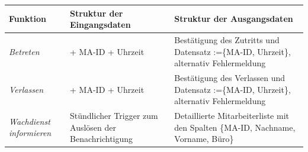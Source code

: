 {
\vspace{1cm}
\hspace{-2cm}
\footnotesize
\begin{tabular}{|p{3cm}|p{6cm}|p{6cm}|}
	\hline
		\textbf{Funktion	} &	
		\textbf{Struktur der Eingangsdaten} &
		\textbf{Struktur der Ausgangsdaten} \\
	\hline \hline
		\textit{Betreten} &
		+ MA-ID \newline + Uhrzeit &
		Best\"atigung des Zutritts und \newline Datensatz :=\{MA-ID, Uhrzeit\}, \newline alternativ Fehlermeldung \\
	\hline
		\textit{Verlassen} &
		+ MA-ID \newline + Uhrzeit &
		Best\"atigung des Verlassen und \newline Datensatz :=\{MA-ID, Uhrzeit\}, \newline alternativ Fehlermeldung \\
	\hline
		\textit{Wachdienst \newline informieren} &
		St\"undlicher Trigger zum Ausl\"osen der Benachrichtigung&
		Detaillierte Mitarbeiterliste mit den Spalten \{MA-ID, Nachname, Vorname, B\"uro\} \\
	\hline 
\end{tabular}
}

